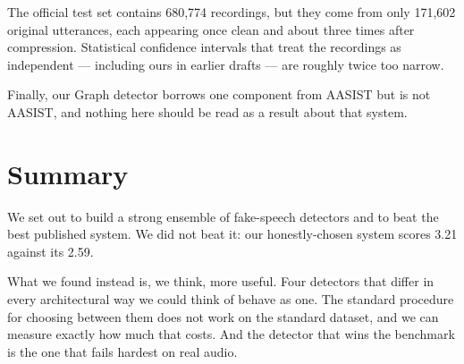 \documentclass[11pt,a4paper]{article}
\begin{document}
The official test set contains 680{,}774 recordings, but they come from only 171{,}602 original
utterances, each appearing once clean and about three times after compression. Statistical
confidence intervals that treat the recordings as independent --- including ours in earlier drafts
--- are roughly twice too narrow.

Finally, our Graph detector borrows one component from AASIST but is not AASIST, and nothing here
should be read as a result about that system.

\section{Summary}

We set out to build a strong ensemble of fake-speech detectors and to beat the best published
system. We did not beat it: our honestly-chosen system scores 3.21 against its 2.59.

What we found instead is, we think, more useful. Four detectors that differ in every architectural
way we could think of behave as one. The standard procedure for choosing between them does not work
on the standard dataset, and we can measure exactly how much that costs. And the detector that wins
the benchmark is the one that fails hardest on real audio.



\end{document}
